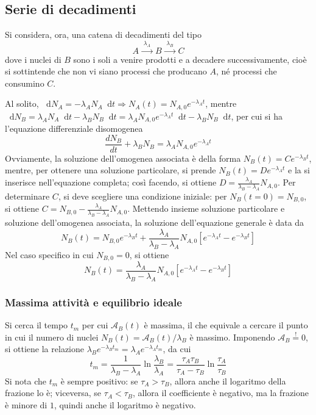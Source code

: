 \documentclass[11pt, a4paper]{scrartcl}
\theoremstyle{style}
\newcommand{\dd}{\mathop{}\!\mathrm{d}}
\numberwithin{equation}{subsection}
\begin{document}
\subsection{Serie di decadimenti}

Si considera, ora, una catena di decadimenti del tipo 
\[
	A \xrightarrow{\ \, \lambda _A \ \, } B \xrightarrow{\ \, \lambda _B \ \, } C
\] 
dove i nuclei di $B$ sono i soli a venire prodotti e a decadere successivamente, cio\`e si sottintende che non vi siano processi che producano $A$, n\'e processi che consumino $C$.

Al solito, $\dd N_A = - \lambda _A N_A \dd t \Rightarrow N_A(t) = N_{A,0} e^{-\lambda _A t}$, mentre $\dd N_B = \lambda _A N_A \dd t - \lambda _B N_B \dd t = \lambda _A N_{A,0}e^{-\lambda _A t}\dd t - \lambda _B N_B \dd t$, per cui si ha l'equazione differenziale disomogenea
\[
 \frac{d N_B}{d t}  + \lambda _B N_B = \lambda _A N_{A,0} e^{-\lambda _At}
\] 
Ovviamente, la soluzione dell'omogenea associata \`e della forma $N_B(t) = C e^{-\lambda _B t}$, mentre, per ottenere una soluzione particolare, si prende $N_B(t) = D e^{-\lambda _A t}$ e la si inserisce nell'equazione completa; cos\`i facendo, si ottiene $D = \frac{\lambda _A}{ \lambda _B - \lambda _A} N_{A,0}$.
Per determinare $C$, si deve scegliere una condizione iniziale: per $N_B(t=0) = N_{B,0}$, si ottiene $C = N_{B,0} - \frac{\lambda _A}{\lambda _B - \lambda _A} N_{A,0}$.
Mettendo insieme soluzione particolare e soluzione dell'omogenea associata, la soluzione dell'equazione generale \`e data da
\begin{equation}
	N_{B}(t) = N_{B,0} e^{-\lambda _B t} + \frac{\lambda _A}{\lambda _B -\lambda _A} N_{A,0} \left[ e^{-\lambda _A t } - e ^{-\lambda _B t } \right] 
\end{equation}
Nel caso specifico in cui $N_{B,0} = 0$, si ottiene 
\[
N_B(t) = \frac{\lambda _A}{ \lambda _B - \lambda _A}N_{A,0} \left[ e^{-\lambda _A t }  - e^{-\lambda _B t }  \right] 
\] 

\subsubsection{Massima attivit\`a e equilibrio ideale}

Si cerca il tempo $t_m$ per cui $\mathcal{A} _B(t)$ \`e massima, il che equivale a cercare il punto in cui il numero di nuclei $N_B(t) = \mathcal{A} _B(t) / \lambda_B $ \`e massimo.
Imponendo $\mathcal{A} _B \stackrel{!}{=} 0$, si ottiene la relazione $\lambda _B e^{-\lambda _B t_m} = \lambda _A e^{-\lambda _A t_m}$, da cui 
\begin{equation}
	t_m = \frac{1}{\lambda _B - \lambda _A} \ln \frac{\lambda _B}{\lambda _A} = \frac{\tau _A \tau _B}{\tau _A - \tau _B} \ln \frac{\tau _A}{ \tau _B}
\end{equation}
Si nota che $t_m$ \`e sempre positivo: se $\tau _A > \tau _B$, allora anche il logaritmo della frazione lo \`e; viceversa, se $\tau _A < \tau _B$, allora il coefficiente \`e negativo, ma la frazione \`e minore di $1$, quindi anche il logaritmo \`e negativo.
\end{document}
